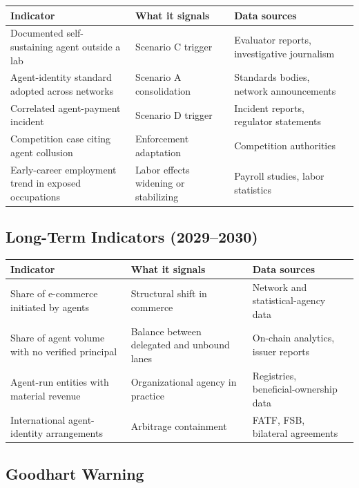\documentclass[11pt,letterpaper]{article}
\begin{document}
\begin{center}
\small
\begin{tabularx}{\linewidth}{ZY{1.04}Y{1.04}Y{0.92}}
\toprule
\textbf{Indicator} & \textbf{What it signals} & \textbf{Data sources} \\
\midrule
Documented self-sustaining agent outside a lab & Scenario C trigger & Evaluator reports, investigative journalism \\
Agent-identity standard adopted across networks & Scenario A consolidation & Standards bodies, network announcements \\
Correlated agent-payment incident & Scenario D trigger & Incident reports, regulator statements \\
Competition case citing agent collusion & Enforcement adaptation & Competition authorities \\
Early-career employment trend in exposed occupations & Labor effects widening or stabilizing & Payroll studies, labor statistics \\
\bottomrule
\end{tabularx}
\end{center}

\subsection{Long-Term Indicators (2029--2030)}

\begin{center}
\small
\begin{tabularx}{\linewidth}{ZY{1.04}Y{1.04}Y{0.92}}
\toprule
\textbf{Indicator} & \textbf{What it signals} & \textbf{Data sources} \\
\midrule
Share of e-commerce initiated by agents & Structural shift in commerce & Network and statistical-agency data \\
Share of agent volume with no verified principal & Balance between delegated and unbound lanes & On-chain analytics, issuer reports \\
Agent-run entities with material revenue & Organizational agency in practice & Registries, beneficial-ownership data \\
International agent-identity arrangements & Arbitrage containment & FATF, FSB, bilateral agreements \\
\bottomrule
\end{tabularx}
\end{center}

\subsection{Goodhart Warning}
\end{document}
